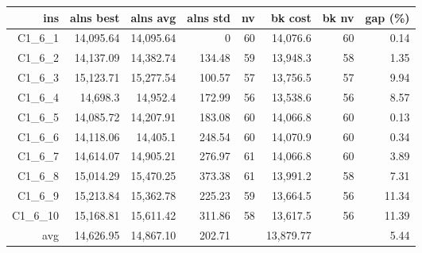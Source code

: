   \begin{table}[caption={Kết quả đo với tập HG\_C\_1\_6 600 yêu cầu}, label=exp:HGC16]
    \small
    \centering
    \begin{tabular}{rrrrrrrr}
    \hline
    ins & alns best & alns avg & alns std & nv & bk cost & bk nv & gap (\%) \\ \hline
    C1\_6\_1 & 14,095.64 & 14,095.64 & 0 & 60 & 14,076.6 & 60 & 0.14 \\ \hline
    C1\_6\_2 & 14,137.09 & 14,382.74 & 134.48 & 59 & 13,948.3 & 58 & 1.35 \\ \hline
    C1\_6\_3 & 15,123.71 & 15,277.54 & 100.57 & 57 & 13,756.5 & 57 & 9.94 \\ \hline
    C1\_6\_4 & 14,698.3 & 14,952.4 & 172.99 & 56 & 13,538.6 & 56 & 8.57 \\ \hline
    C1\_6\_5 & 14,085.72 & 14,207.91 & 183.08 & 60 & 14,066.8 & 60 & 0.13 \\ \hline
    C1\_6\_6 & 14,118.06 & 14,405.1 & 248.54 & 60 & 14,070.9 & 60 & 0.34 \\ \hline
    C1\_6\_7 & 14,614.07 & 14,905.21 & 276.97 & 61 & 14,066.8 & 60 & 3.89 \\ \hline
    C1\_6\_8 & 15,014.29 & 15,470.25 & 373.38 & 61 & 13,991.2 & 58 & 7.31 \\ \hline
    C1\_6\_9 & 15,213.84 & 15,362.78 & 225.23 & 59 & 13,664.5 & 56 & 11.34 \\ \hline
    C1\_6\_10 & 15,168.81 & 15,611.42 & 311.86 & 58 & 13,617.5 & 56 & 11.39 \\ \hline
    avg & 14,626.95 & 14,867.10 & 202.71 & & 13,879.77 & & 5.44 \\ \hline
    \end{tabular}
  \end{table}

